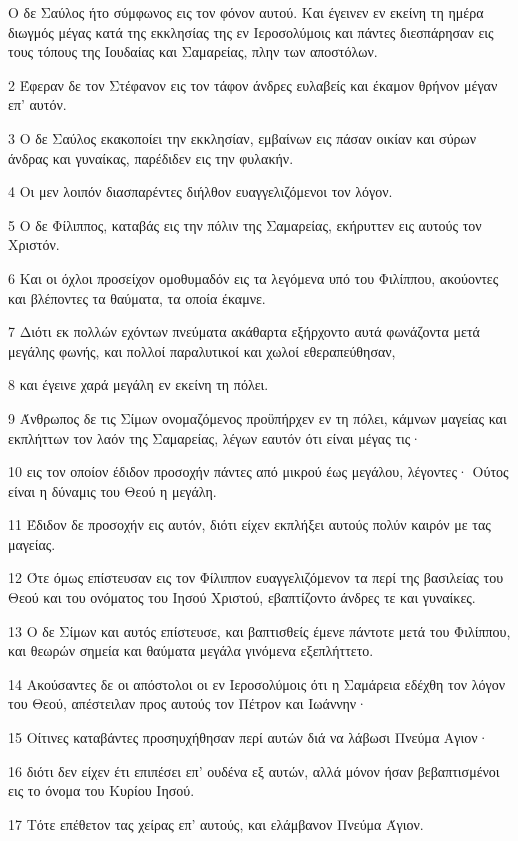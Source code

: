 \par Ο δε Σαύλος ήτο σύμφωνος εις τον φόνον αυτού. Και έγεινεν εν εκείνη τη ημέρα διωγμός μέγας κατά της εκκλησίας της εν Ιεροσολύμοις και πάντες διεσπάρησαν εις τους τόπους της Ιουδαίας και Σαμαρείας, πλην των αποστόλων.
\par 2 Έφεραν δε τον Στέφανον εις τον τάφον άνδρες ευλαβείς και έκαμον θρήνον μέγαν επ' αυτόν.
\par 3 Ο δε Σαύλος εκακοποίει την εκκλησίαν, εμβαίνων εις πάσαν οικίαν και σύρων άνδρας και γυναίκας, παρέδιδεν εις την φυλακήν.
\par 4 Οι μεν λοιπόν διασπαρέντες διήλθον ευαγγελιζόμενοι τον λόγον.
\par 5 Ο δε Φίλιππος, καταβάς εις την πόλιν της Σαμαρείας, εκήρυττεν εις αυτούς τον Χριστόν.
\par 6 Και οι όχλοι προσείχον ομοθυμαδόν εις τα λεγόμενα υπό του Φιλίππου, ακούοντες και βλέποντες τα θαύματα, τα οποία έκαμνε.
\par 7 Διότι εκ πολλών εχόντων πνεύματα ακάθαρτα εξήρχοντο αυτά φωνάζοντα μετά μεγάλης φωνής, και πολλοί παραλυτικοί και χωλοί εθεραπεύθησαν,
\par 8 και έγεινε χαρά μεγάλη εν εκείνη τη πόλει.
\par 9 Άνθρωπος δε τις Σίμων ονομαζόμενος προϋπήρχεν εν τη πόλει, κάμνων μαγείας και εκπλήττων τον λαόν της Σαμαρείας, λέγων εαυτόν ότι είναι μέγας τις·
\par 10 εις τον οποίον έδιδον προσοχήν πάντες από μικρού έως μεγάλου, λέγοντες· Ούτος είναι η δύναμις του Θεού η μεγάλη.
\par 11 Έδιδον δε προσοχήν εις αυτόν, διότι είχεν εκπλήξει αυτούς πολύν καιρόν με τας μαγείας.
\par 12 Ότε όμως επίστευσαν εις τον Φίλιππον ευαγγελιζόμενον τα περί της βασιλείας του Θεού και του ονόματος του Ιησού Χριστού, εβαπτίζοντο άνδρες τε και γυναίκες.
\par 13 Ο δε Σίμων και αυτός επίστευσε, και βαπτισθείς έμενε πάντοτε μετά του Φιλίππου, και θεωρών σημεία και θαύματα μεγάλα γινόμενα εξεπλήττετο.
\par 14 Ακούσαντες δε οι απόστολοι οι εν Ιεροσολύμοις ότι η Σαμάρεια εδέχθη τον λόγον του Θεού, απέστειλαν προς αυτούς τον Πέτρον και Ιωάννην·
\par 15 Οίτινες καταβάντες προσηυχήθησαν περί αυτών διά να λάβωσι Πνεύμα Αγιον·
\par 16 διότι δεν είχεν έτι επιπέσει επ' ουδένα εξ αυτών, αλλά μόνον ήσαν βεβαπτισμένοι εις το όνομα του Κυρίου Ιησού.
\par 17 Τότε επέθετον τας χείρας επ' αυτούς, και ελάμβανον Πνεύμα Άγιον.
